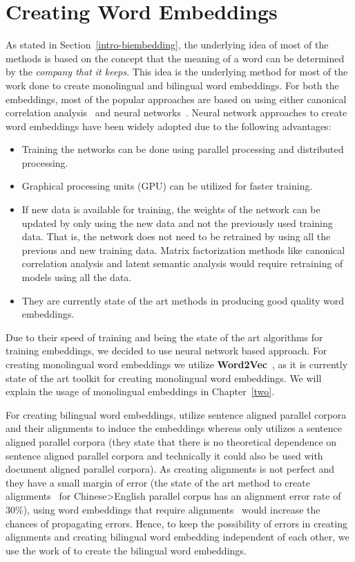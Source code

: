 \section{Creating Word Embeddings}
As stated in Section~\ref{intro-biembedding}, the underlying idea of most of the methods is based on the concept that the meaning of a word can be determined by the \textit{company that it keeps}. This idea is the underlying method for most of the work done to create monolingual and bilingual word embeddings. For both the embeddings, most of the popular approaches are based on using either canonical correlation analysis~\cite{Dhillon2011, Faruqui2014} and neural networks~\cite{Collobert2008, Huang2012, Klementiev12, Mikolov2013a, Mikolov2013b, Mikolov2013c, Zou13, Hermann14, Chandar2014}. Neural network approaches to create word embeddings have been widely adopted due to the following advantages:
\begin{itemize}
	\item Training the networks can be done using parallel processing and distributed processing.
	\item Graphical processing units (GPU) can be utilized for faster training.
	\item If new data is available for training, the weights of the network can be updated by only using the new data and not the previously used training data. That is, the network does not need to be retrained by using all the previous and new training data. Matrix factorization methods like canonical correlation analysis and latent semantic analysis would require retraining of models using all the data.
	\item They are currently state of the art methods in producing good quality word embeddings.
\end{itemize}

Due to their speed of training and being the state of the art algorithms for training embeddings, we decided to use neural network based approach. For creating monolingual word embeddings we utilize \textbf{Word2Vec}~\cite{Mikolov2013a,Mikolov2013b,Mikolov2013c}, as it is currently state of the art toolkit for creating monolingual word embeddings. We will explain the usage of monolingual embeddings in Chapter~\ref{two}. 

For creating bilingual word embeddings, \cite{Zou13} utilize sentence aligned parallel corpora and their alignments to induce the embeddings whereas \cite{Hermann14} only utilizes a sentence aligned parallel corpora (they state that there is no theoretical dependence on sentence aligned parallel corpora and technically it could also be used with document aligned parallel corpora). As creating alignments is not perfect and they have a small margin of error (the state of the art method to create alignments~\cite{Kirkpatrick2010} for Chinese>English parallel corpus has an alignment error rate of 30\%), using word embeddings that require alignments~\cite{Zou13} would increase the chances of propagating errors. Hence, to keep the possibility of errors in creating alignments and creating bilingual word embedding independent of each other, we use the work of \cite{Hermann14} to create the bilingual word embeddings.

